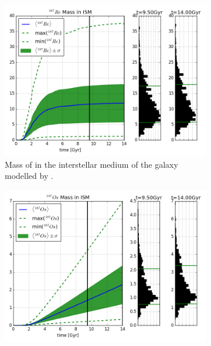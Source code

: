 \iftrue
\begin{figure}
  \centering
  \begin{subfigure}{\subfigwidth}
    \includegraphics[width=\linewidth]{results/MCExperiment_revised_2_imfslope/combined_plot_Re-187_decayed.png}
    \caption{\label{fig:MCExperiment-imfslope-re187}
      Mass of  in the interstellar medium of the galaxy modelled by \omegamodel.
    }
  \end{subfigure}
  \begin{subfigure}{\subfigwidth}
    \includegraphics[width=\linewidth]{results/MCExperiment_revised_2_imfslope/combined_plot_Os-187_decayed.png}
    \caption{\label{fig:MCExperiment-imfslope-os187}
}
\end{subfigure}
\end{figure}
